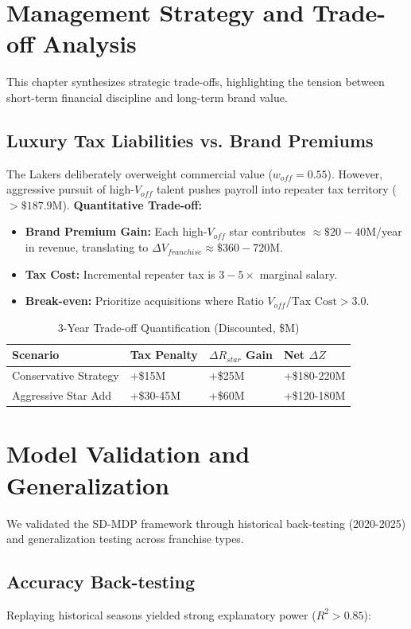 \documentclass[12pt]{article}
\begin{document}
\section{Management Strategy and Trade-off Analysis}
This chapter synthesizes strategic trade-offs, highlighting the tension between short-term financial discipline and long-term brand value.

\subsection{Luxury Tax Liabilities vs. Brand Premiums}
The Lakers deliberately overweight commercial value ($w_{off}=0.55$). However, aggressive pursuit of high-$V_{off}$ talent pushes payroll into repeater tax territory ($>\$187.9$M).
\textbf{Quantitative Trade-off:}
\begin{itemize}
    \item \textbf{Brand Premium Gain:} Each high-$V_{off}$ star contributes $\approx \$20-40$M/year in revenue, translating to $\Delta V_{franchise} \approx \$360-720$M.
    \item \textbf{Tax Cost:} Incremental repeater tax is $3-5\times$ marginal salary.
    \item \textbf{Break-even:} Prioritize acquisitions where Ratio $V_{off} / \text{Tax Cost} > 3.0$.
\end{itemize}

\begin{table}[H]
\centering
\caption{3-Year Trade-off Quantification (Discounted, \$M)}
\begin{tabular}{llll}
\toprule
\textbf{Scenario} & \textbf{Tax Penalty} & \textbf{$\Delta R_{star}$ Gain} & \textbf{Net $\Delta Z$} \\
\midrule
Conservative Strategy & +\$15M & +\$25M & +\$180-220M \\
Aggressive Star Add & +\$30-45M & +\$60M & +\$120-180M \\
\bottomrule
\end{tabular}
\end{table}

\section{Model Validation and Generalization}
We validated the SD-MDP framework through historical back-testing (2020-2025) and generalization testing across franchise types.

\subsection{Accuracy Back-testing}
Replaying historical seasons yielded strong explanatory power ($R^2 > 0.85$):
\end{document}
